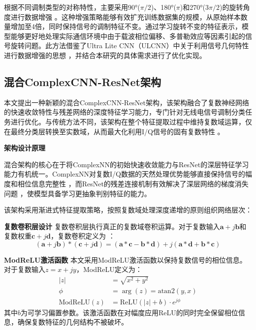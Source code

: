 \documentclass[conference]{IEEEtran}
\begin{document}
根据不同调制类型的对称特性，主要采用90°($\pi/2$)、180°($\pi$)和270°($3\pi/2$)的旋转角度进行数据增强 \cite{[1]}\cite{[48]}。这种增强策略能够有效扩充训练数据集的规模，从原始样本数量增加至4倍，同时保持信号的调制特征不变。通过学习旋转不变的特征表示，模型能够更好地处理实际通信环境中由于载波相位偏移、多普勒效应等因素引起的信号旋转问题。此方法借鉴了Ultra Lite CNN（ULCNN）\cite{b1}中关于利用信号几何特性进行数据增强的思想 \cite{[23]}\cite{[48]}，并结合本研究的具体需求进行了优化实现。

\subsection{混合ComplexCNN-ResNet架构}

本文提出一种新颖的混合ComplexCNN-ResNet架构，该架构融合了复数神经网络的快速收敛特性与残差网络的深度特征学习能力，专门针对无线电信号调制分类任务进行优化。与传统方法不同，该架构在整个特征提取过程中维持复数域运算，仅在最终分类层转换至实数域，从而最大化利用I/Q信号的固有复数特性 \cite{[1]}\cite{[11]}。

\textbf{架构设计原理}

混合架构的核心在于将ComplexNN的初始快速收敛能力与ResNet的深层特征学习能力有机统一。ComplexNN对复数I/Q数据的天然处理优势能够直接保持信号的幅度和相位信息完整性 \cite{[11]}，而ResNet的残差连接机制有效解决了深层网络的梯度消失问题 \cite{[13]}\cite{[14]}，使模型具备学习更抽象判别特征的能力。

该架构采用渐进式特征提取策略，按照复数域处理深度递增的原则组织网络层次：

\textbf{复数卷积层设计} 复数卷积层执行真正的复数域卷积运算。对于复数输入$\mathbf{a} + j\mathbf{b}$和复数权重$\mathbf{c} + j\mathbf{d}$，复数卷积定义为 \cite{[11]}\cite{[46]}：
\begin{equation}
(\mathbf{a} + j\mathbf{b}) * (\mathbf{c} + j\mathbf{d}) = 
(\mathbf{a} * \mathbf{c} - \mathbf{b} * \mathbf{d})
+ j(\mathbf{a} * \mathbf{d} + \mathbf{b} * \mathbf{c})
\end{equation}

\textbf{ModReLU激活函数} 本文采用ModReLU激活函数以保持复数信号的相位信息。对于复数输入$z = x + jy$，ModReLU定义为：
\begin{align}
|z|
&= \sqrt{x^2 + y^2} \\
\phi &= \arg(z) = \mathrm{atan2}(y,x) \\
\text{ModReLU}(z) &= \text{ReLU}(|z| + b) \cdot e^{j\phi}
\end{align}
其中$b$为可学习偏置参数。该激活函数在对幅度应用ReLU的同时完全保留相位信息，确保复数特征的几何结构不被破坏。
\end{document}
